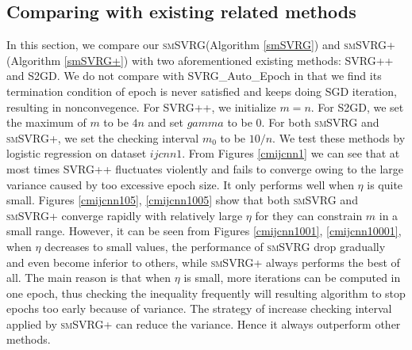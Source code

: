 \documentclass[conference]{IEEEtran}
\begin{document}
\subsection{Comparing with existing related methods}
In this section, we compare our \textsc{smSVRG}(Algorithm \ref{smSVRG}) and \textsc{smSVRG+}(Algorithm \ref{smSVRG+}) with two aforementioned existing methods: SVRG++ and S2GD. We do not compare with SVRG\_Auto\_Epoch in that we find its termination condition of epoch is never satisfied and keeps doing SGD iteration, resulting in nonconvegence. For SVRG++, we initialize $m = n$. For S2GD, we set the maximum of $m$ to be $4n$ and set $gamma$ to be $0$. For both \textsc{smSVRG} and \textsc{smSVRG+}, we set the checking interval $m_0$ to be $10/n$.
We test these methods by logistic regression on dataset $ijcnn1$. 
From Figures \ref{cmijcnn1} we can see that at most times SVRG++ fluctuates violently and fails to converge owing to the large variance caused by too excessive epoch size. It only performs well when $\eta$ is quite small.
Figures \ref{cmijcnn105}, \ref{cmijcnn1005} show that both \textsc{smSVRG} and \textsc{smSVRG+} converge rapidly with relatively large $\eta$ for they can constrain $m$ in a small range. However, it can be seen from Figures \ref{cmijcnn1001}, \ref{cmijcnn10001}, when $\eta$ decreases to small values, the performance of \textsc{smSVRG} drop gradually and even become inferior to others, while \textsc{smSVRG+} always performs the best of all. The main reason is that  when $\eta$ is small, more iterations can be computed in one epoch, thus checking the inequality frequently will resulting algorithm to stop epochs too early because of variance. The strategy of increase checking interval applied by \textsc{smSVRG+} can reduce the variance. Hence it always outperform other methods.
\end{document}
